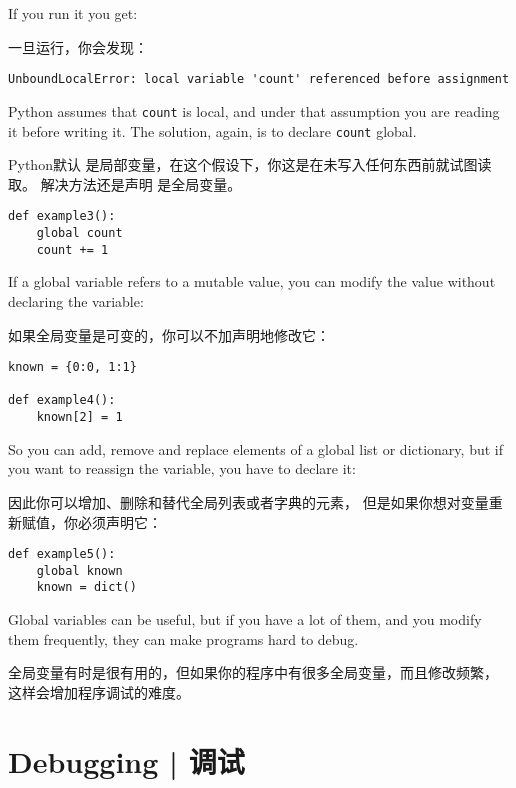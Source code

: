%
If you run it you get:

一旦运行，你会发现：

  

\begin{lstlisting}
UnboundLocalError: local variable 'count' referenced before assignment
\end{lstlisting}

%
Python assumes that {\tt count} is local, and under that assumption
you are reading it before writing it.  The solution, again,
is to declare {\tt count} global.

Python默认  是局部变量，在这个假设下，你这是在未写入任何东西前就试图读取。
解决方法还是声明  是全局变量。


\begin{lstlisting}
def example3():
    global count
    count += 1
\end{lstlisting}

%
If a global variable refers to a mutable value, you can modify
the value without declaring the variable:

如果全局变量是可变的，你可以不加声明地修改它：


\begin{lstlisting}
known = {0:0, 1:1}

def example4():
    known[2] = 1
\end{lstlisting}

%
So you can add, remove and replace elements of a global list or
dictionary, but if you want to reassign the variable, you
have to declare it:

因此你可以增加、删除和替代全局列表或者字典的元素，
但是如果你想对变量重新赋值，你必须声明它：

\begin{lstlisting}
def example5():
    global known
    known = dict()
\end{lstlisting}

%
Global variables can be useful, but if you have a lot of them,
and you modify them frequently, they can make programs
hard to debug.

全局变量有时是很有用的，但如果你的程序中有很多全局变量，而且修改频繁，
这样会增加程序调试的难度。

\section{Debugging  |  调试}

